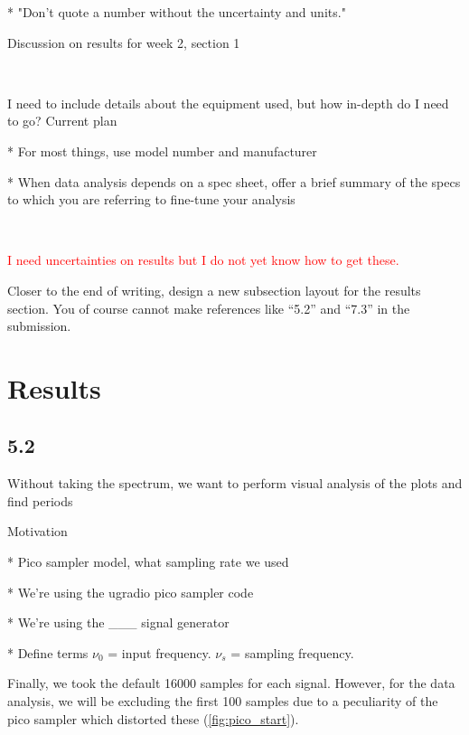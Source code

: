 \documentclass[a4paper]{article}
\begin{document}
* "Don't quote a number without the uncertainty and units."


Discussion on results for week 2, section 1

\

I need to include details about the equipment used, but how in-depth do I need to go? Current plan

* For most things, use model number and manufacturer

* When data analysis depends on a spec sheet, offer a brief summary of the specs to which you are referring to fine-tune your analysis

\

\textcolor{red}{I need uncertainties on results but I do not yet know how to get these.}

Closer to the end of writing, design a new subsection layout for the results section. You of course cannot make references like ``5.2'' and ``7.3'' in the submission.

\section{Results}

\subsection{5.2}

Without taking the spectrum, we want to perform visual analysis of the plots and find periods

Motivation

* Pico sampler model, what sampling rate we used

* We're using the ugradio pico sampler code

* We're using the \_\_\_ signal generator

* Define terms $\nu_0$ = input frequency. $\nu_s$ = sampling frequency.

Finally, we took the default 16000 samples for each signal. However, for the data analysis, we will be excluding the first 100 samples due to a peculiarity of the pico sampler which distorted these (\ref{fig:pico_start}).

\end{document}
